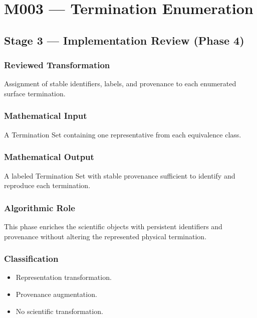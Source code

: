\chapter{M003 --- Termination Enumeration}

\section{Stage 3 --- Implementation Review (Phase 4)}

\subsection{Reviewed Transformation}

Assignment of stable identifiers, labels, and provenance to each
enumerated surface termination.

\subsection{Mathematical Input}

A Termination Set containing one representative from each equivalence
class.

\subsection{Mathematical Output}

A labeled Termination Set with stable provenance sufficient to identify
and reproduce each termination.

\subsection{Algorithmic Role}

This phase enriches the scientific objects with persistent identifiers
and provenance without altering the represented physical termination.

\subsection{Classification}

\begin{itemize}
\item Representation transformation.
\item Provenance augmentation.
\item No scientific transformation.
\end{itemize}

